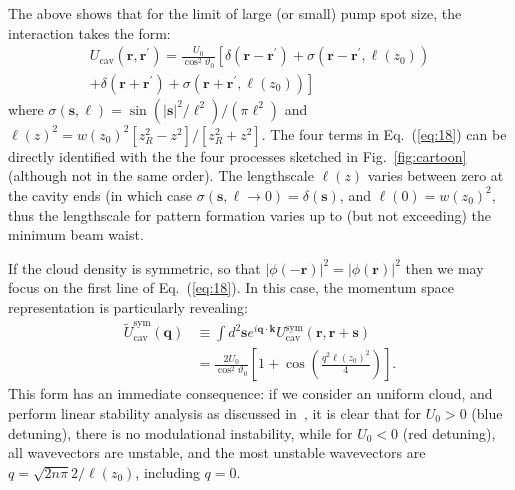 \documentclass[pra,twocolumn,superscriptaddress]{revtex4-1}
\newcommand{\vect}[1]{\mathbf{#1}}
\newcommand{\wf}{\phi}
\begin{document}
The above shows that for the limit of large (or small) pump spot size,
the interaction takes the form:
\begin{multline}
  \label{eq:18}
  U_{\text{cav}}(\vect r, \vect r^\prime)
  =
  \frac{U_0}{\cos^2\vartheta_0}
  \left[
    \delta(\vect r - \vect r^\prime)
    +
    \sigma(\vect r - \vect r^\prime, \ell(z_0))
    \right.\\\left.+
    \delta(\vect r + \vect r^\prime)
    +
    \sigma(\vect r + \vect r^\prime, \ell(z_0))
  \right]
\end{multline}
where $\sigma(\vect s, \ell) = \sin(|\vect s|^2/\ell^2) / (\pi
\ell^2)$ and $\ell(z)^2 = w(z_0)^2 [z_R^2-z^2]/[z_R^2+z^2]$.  The four
terms in Eq.~(\ref{eq:18}) can be directly identified with the the
four processes sketched in Fig.~\ref{fig:cartoon} (although not in the
same order).  The lengthscale $\ell(z)$ varies between zero at the
cavity ends (in which case $\sigma(\vect s, \ell \to 0) = \delta(\vect
s)$, and $\ell(0) = w(z_0)^2$, thus the lengthscale for pattern
formation varies up to (but not exceeding) the minimum beam waist.


If the cloud density is symmetric, so that $|\wf(-\vect r)|^2 =
|\wf(\vect r)|^2$ then we may focus on the first line of
Eq.~(\ref{eq:18}).  In this case, the momentum space representation is
particularly revealing:
\begin{align}
  \tilde{U}^{\text{sym}}_{\text{cav}}(\vect q)
  &\equiv
  \int d^2 \vect s e^{i \vect q \cdot \vect k}
  U^{\text{sym}}_{\text{cav}}(\vect r, \vect r + \vect s)
  \nonumber\\&=
  \frac{2U_0}{\cos^2\vartheta_0}
  \left[1 + \cos\left( \frac{q^2 \ell(z_0)^2}{4} \right) \right].
\end{align}
This form has an immediate consequence: if we consider an uniform
cloud, and perform linear stability analysis as discussed
in~\cite{Robb2015}, it is clear that for $U_0>0$ (blue detuning),
there is no modulational instability, while for $U_0 < 0$ (red
detuning), all wavevectors are unstable, and the most unstable
wavevectors are $q = \sqrt{2n\pi} 2/\ell(z_0)$, including $q=0$.
\end{document}
